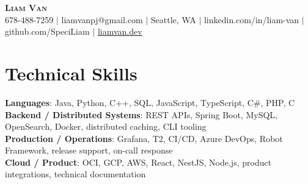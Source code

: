 \documentclass[letterpaper,11pt]{article}
\begin{document}

%
\begin{center}
    \textbf{\Huge \scshape Liam Van} \\ \vspace{1pt}
    \small 678-488-7259 $|$ \small {liamvanpj@gmail.com} $|$ Seattle, WA
 {{$|$ linkedin.com/in/liam-van} {$|$ github.com/SpeciLiam} {$|$ \href{https://liamvan.dev}{liamvan.dev}}}

\end{center}

\section{Technical Skills}
 \begin{itemize}[leftmargin=0.15in, label={}]
    \small{\item{
     \textbf{Languages}{: Java, Python, C++, SQL, JavaScript, TypeScript, C\#, PHP, C} \\
     \textbf{Backend / Distributed Systems}{: REST APIs, Spring Boot, MySQL, OpenSearch, Docker, distributed caching, CLI tooling} \\
     \textbf{Production / Operations}{: Grafana, T2, CI/CD, Azure DevOps, Robot Framework, release support, on-call response} \\
     \textbf{Cloud / Product}{: OCI, GCP, AWS, React, NestJS, Node.js, product integrations, technical documentation} \\
    }}
 \end{itemize}
%

\end{document}
